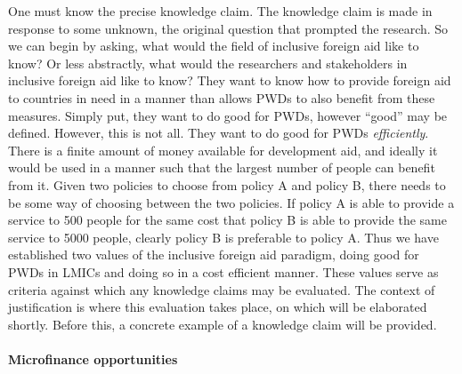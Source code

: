 \documentclass[a4paper]{article}
\begin{document}
One must know the precise knowledge claim. The knowledge claim is made in
response to some unknown, the original question that prompted the research.
So we can begin by asking, what would the field of inclusive foreign aid like
to know? Or less abstractly, what would the researchers and stakeholders in
inclusive foreign aid like to know? They want to know how to provide foreign
aid to countries in need in a manner than allows PWDs to also benefit from
these measures. Simply put, they want to do good for PWDs, however ``good''
may be defined. However, this is not all. They want to do good for PWDs
\emph{efficiently}. There is a finite amount of money available for
development aid, and ideally it would be used in a manner such that the
largest number of people can benefit from it. Given two policies to choose
from policy A and policy B, there needs to be some way of choosing between the
two policies. If policy A is able to provide a service to 500 people for the
same cost that policy B is able to provide the same service to 5000 people,
clearly policy B is preferable to policy A. Thus we have established two
values of the inclusive foreign aid paradigm, doing good for PWDs in LMICs and
doing so in a cost efficient manner. These values serve as criteria against
which any knowledge claims may be evaluated. The context of justification is
where this evaluation takes place, on which will be elaborated shortly. Before
this, a concrete example of a knowledge claim will be provided.

\paragraph{Microfinance opportunities}

\end{document}
